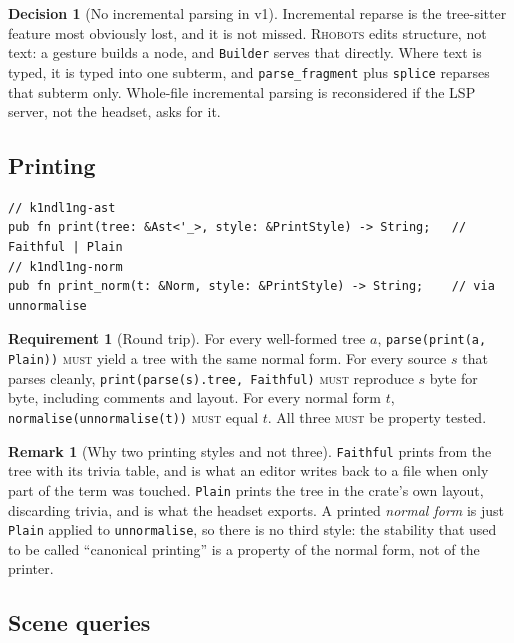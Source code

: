 \documentclass[11pt,a4paper]{article}
\newcommand{\code}[1]{\texttt{#1}}
\newcommand{\Rhobots}{\textsc{Rhobots}}
\newcommand{\MUST}{\textsc{must}}
\theoremstyle{definition}
\newtheorem{requirement}[definition]{Requirement}
\newtheorem{decision}[definition]{Decision}
\newtheorem{remark}[definition]{Remark}
\theoremstyle{plain}
\begin{document}
\begin{decision}[No incremental parsing in v1]
Incremental reparse is the tree-sitter feature most obviously lost, and it is
not missed. \Rhobots{} edits structure, not text: a gesture builds a node, and
\code{Builder} serves that directly. Where text is typed, it is typed into one
subterm, and \code{parse\_fragment} plus \code{splice} reparses that subterm
only. Whole-file incremental parsing is reconsidered if the LSP server, not the
headset, asks for it.
\end{decision}

\subsection{Printing}

\begin{lstlisting}
// k1ndl1ng-ast
pub fn print(tree: &Ast<'_>, style: &PrintStyle) -> String;   // Faithful | Plain
// k1ndl1ng-norm
pub fn print_norm(t: &Norm, style: &PrintStyle) -> String;    // via unnormalise
\end{lstlisting}

\begin{requirement}[Round trip]\label{req:roundtrip}
For every well-formed tree $a$, \code{parse(print(a, Plain))} \MUST{} yield a
tree with the same normal form. For every source $s$ that parses cleanly,
\code{print(parse(s).tree, Faithful)} \MUST{} reproduce $s$ byte for byte,
including comments and layout. For every normal form $t$,
\code{normalise(unnormalise(t))} \MUST{} equal $t$. All three \MUST{} be
property tested.
\end{requirement}

\begin{remark}[Why two printing styles and not three]
\code{Faithful} prints from the tree with its trivia table, and is what an
editor writes back to a file when only part of the term was touched.
\code{Plain} prints the tree in the crate's own layout, discarding trivia, and
is what the headset exports. A printed \emph{normal form} is just
\code{Plain} applied to \code{unnormalise}, so there is no third style: the
stability that used to be called ``canonical printing'' is a property of the
normal form, not of the printer.
\end{remark}

\subsection{Scene queries}
\end{document}
